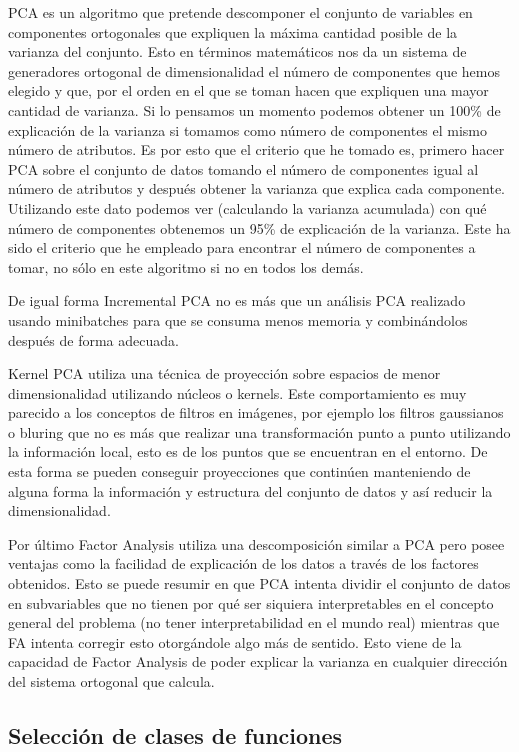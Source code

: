 \documentclass[12pt,a4paper]{article}
\begin{document}
PCA es un algoritmo que pretende descomponer el conjunto de variables en componentes ortogonales que expliquen la máxima cantidad posible de la varianza del conjunto. Esto en términos matemáticos nos da un sistema de generadores ortogonal de dimensionalidad el número de componentes que hemos elegido y que, por el orden en el que se toman hacen que expliquen una mayor cantidad de varianza. Si lo pensamos un momento podemos obtener un 100\% de explicación de la varianza si tomamos como número de componentes el mismo número de atributos. Es por esto que el criterio que he tomado es, primero hacer PCA sobre el conjunto de datos tomando el número de componentes igual al número de atributos y después obtener la varianza que explica cada componente. Utilizando este dato podemos ver (calculando la varianza acumulada) con qué número de componentes obtenemos un 95\% de explicación de la varianza. Este ha sido el criterio que he empleado para encontrar el número de componentes a tomar, no sólo en este algoritmo si no en todos los demás.

De igual forma Incremental PCA no es más que un análisis PCA realizado usando minibatches para que se consuma menos memoria y combinándolos después de forma adecuada. 

Kernel PCA utiliza una técnica de proyección sobre espacios de menor dimensionalidad utilizando núcleos o kernels. Este comportamiento es muy parecido a los conceptos de filtros en imágenes, por ejemplo los filtros gaussianos o bluring que no es más que realizar una transformación punto a punto utilizando la información local, esto es de los puntos que se encuentran en el entorno. De esta forma se pueden conseguir proyecciones que continúen manteniendo de alguna forma la información y estructura del conjunto de datos y así reducir la dimensionalidad.

Por último Factor Analysis utiliza una descomposición similar a PCA pero posee ventajas como la facilidad de explicación de los datos a través de los factores obtenidos. Esto se puede resumir en que PCA intenta dividir el conjunto de datos en subvariables que no tienen por qué ser siquiera interpretables en el concepto general del problema (no tener interpretabilidad en el mundo real) mientras que FA intenta corregir esto otorgándole algo más de sentido. Esto viene de la capacidad de Factor Analysis de poder explicar la varianza en cualquier dirección del sistema ortogonal que calcula.

\subsection{Selección de clases de funciones}
\end{document}
